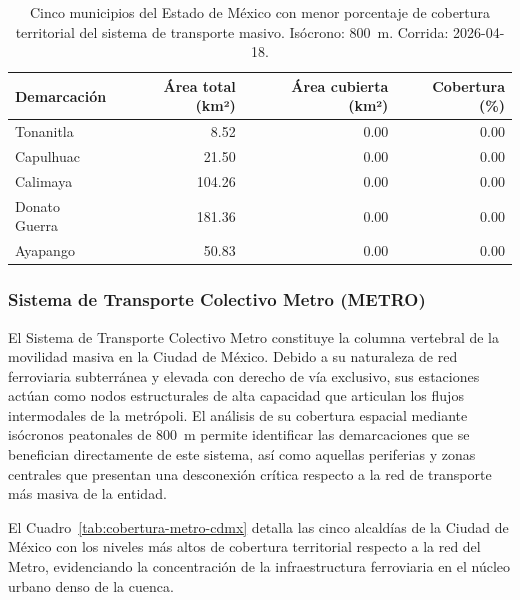 \begin{table}[H]
    \centering
    \caption[Municipios del EDOMEX con menor cobertura de transporte masivo]{
    Cinco municipios del Estado de México con menor porcentaje de cobertura
    territorial del sistema de transporte masivo. Isócrono: 800~m.
    Corrida: 2026-04-18.}
    \label{tab:peores-edomex}
    \begin{tabular}{|l|r|r|r|}
        \hline
        \textbf{Demarcación} & \textbf{Área total (km²)} &
        \textbf{Área cubierta (km²)} & \textbf{Cobertura (\%)} \\
        \hline
        Tonanitla       &   8.52 & 0.00 & 0.00 \\
        Capulhuac       &  21.50 & 0.00 & 0.00 \\
        Calimaya        & 104.26 & 0.00 & 0.00 \\
        Donato Guerra   & 181.36 & 0.00 & 0.00 \\
        Ayapango        &  50.83 & 0.00 & 0.00 \\
        \hline
    \end{tabular}
\end{table}


\subsubsection{Sistema de Transporte Colectivo Metro (METRO)}
\label{subsubsec:cobertura-metro}

El Sistema de Transporte Colectivo Metro constituye la columna vertebral de la
movilidad masiva en la Ciudad de México. Debido a su naturaleza de red
ferroviaria subterránea y elevada con derecho de vía exclusivo, sus estaciones
actúan como nodos estructurales de alta capacidad que articulan los flujos
intermodales de la metrópoli. El análisis de su cobertura espacial mediante
isócronos peatonales de 800~m permite identificar las demarcaciones que se
benefician directamente de este sistema, así como aquellas periferias y zonas
centrales que presentan una desconexión crítica respecto a la red de transporte
más masiva de la entidad.

El Cuadro~\ref{tab:cobertura-metro-cdmx} detalla las cinco alcaldías de la
Ciudad de México con los niveles más altos de cobertura territorial respecto a
la red del Metro, evidenciando la concentración de la infraestructura
ferroviaria en el núcleo urbano denso de la cuenca.

